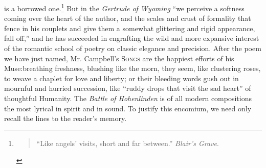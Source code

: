 is a borrowed one.\footnote{\begin{quote}
    ``Like angels' visits, short and far between.''\textemdash
    \emph{Blair's Grave}.
\end{quote}
} But in the \emph{Gertrude of Wyoming} ``we perceive a
softness coming over the heart of the author, and the scales and crust
of formality that fence in his couplets and give them a somewhat
glittering and rigid appearance, fall off,'' and he has succeeded in
engrafting the wild and more expansive interest of the romantic school
of poetry on classic elegance and precision. After the poem we have
just named, Mr. Campbell's \textsc{Songs} are the happiest efforts of his
Muse:\textemdash breathing freshness, blushing like the morn, they seem, like
clustering roses, to weave a chaplet for love and liberty; or their
bleeding words gush out in mournful and hurried succession, like ``ruddy
drops that visit the sad heart'' of thoughtful Humanity. The \emph{Battle of
Hohenlinden} is of all modern compositions the most lyrical in spirit
and in sound. To justify this encomium, we need only recall the lines to
the reader's memory.

